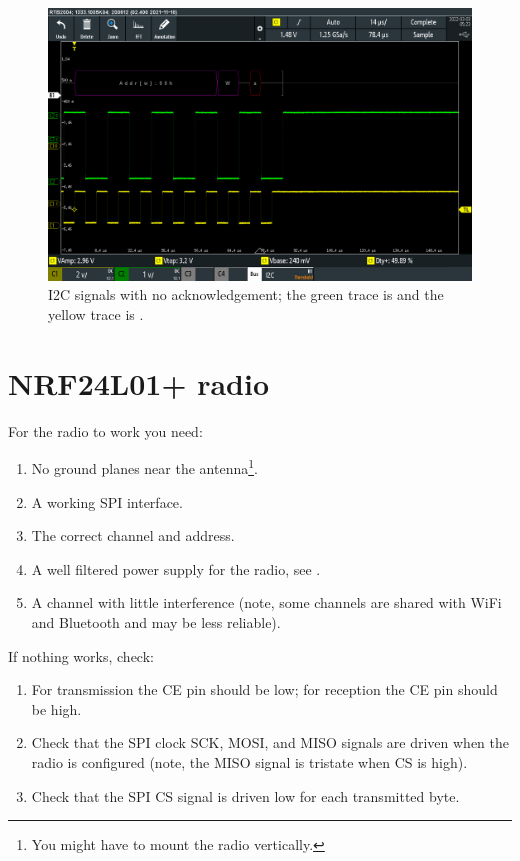 \begin{figure}[!h]
  \centering
  \includegraphics[width=\linewidth]{figs/i2c-noack.png}
  \caption{I2C signals with no acknowledgement; the green trace is
   and the yellow trace is .}
  \label{fig:i2c-noack}
\end{figure}


\section{NRF24L01+ radio}
\label{nrf24l01-radio}

For the radio to work you need:

\begin{enumerate}
\item No ground planes near the antenna\footnote{You might have to
  mount the radio vertically.}.

\item A working SPI interface.

\item The correct channel and address.

\item A well filtered power supply for the radio, see .

\item A channel with little interference (note, some channels are
  shared with WiFi and Bluetooth and may be less reliable).
\end{enumerate}

If nothing works, check:

\begin{enumerate}
\item
  For transmission the CE pin should be low; for reception the CE pin
  should be high.
\item
  Check that the SPI clock SCK, MOSI, and MISO signals are driven when
  the radio is configured (note, the MISO signal is tristate when CS is
  high).
\item
  Check that the SPI CS signal is driven low for each transmitted byte.
\end{enumerate}

